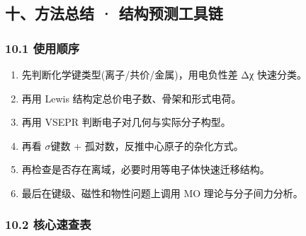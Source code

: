 \documentclass[a4paper,11pt]{ctexart}
\providecommand{\tightlist}{\setlength{\itemsep}{0pt}\setlength{\parskip}{0pt}}
\newcommand{\箭}{\ensuremath{\rightarrow}}
\newcommand{\左箭}{\ensuremath{\leftarrow}}
\newcommand{\上箭}{\ensuremath{\uparrow}}
\newcommand{\下箭}{\ensuremath{\downarrow}}
\newcommand{\衡}{\ensuremath{\rightleftharpoons}}
\newcommand{\双箭}{\ensuremath{\leftrightarrow}}
\newcommand{\约等于}{\ensuremath{\approx}}
\newcommand{\小于等于}{\ensuremath{\leq}}
\newcommand{\大于等于}{\ensuremath{\geq}}
\newcommand{\不等于}{\ensuremath{\neq}}
\newcommand{\西格马}{\ensuremath{\sigma}}
\newcommand{\派}{\ensuremath{\pi}}
\begin{document}
\subsection{十、方法总结 · 结构预测工具链}\label{ux5341ux65b9ux6cd5ux603bux7ed3-ux7ed3ux6784ux9884ux6d4bux5de5ux5177ux94fe}

\subsubsection{10.1 使用顺序}\label{ux4f7fux7528ux987aux5e8f}

\begin{enumerate}
\def\labelenumi{\arabic{enumi}.}
\setcounter{enumi}{-1}
\tightlist
\item
  先判断化学键类型(离子/共价/金属)，用电负性差 Δχ 快速分类。
\item
  再用 Lewis 结构定总价电子数、骨架和形式电荷。
\item
  再用 VSEPR 判断电子对几何与实际分子构型。
\item
  再看 \西格马 键数 + 孤对数，反推中心原子的杂化方式。
\item
  再检查是否存在离域，必要时用等电子体快速迁移结构。
\item
  最后在键级、磁性和物性问题上调用 MO 理论与分子间力分析。
\end{enumerate}

\subsubsection{10.2 核心速查表}\label{ux6838ux5fc3ux901fux67e5ux8868}
\end{document}
